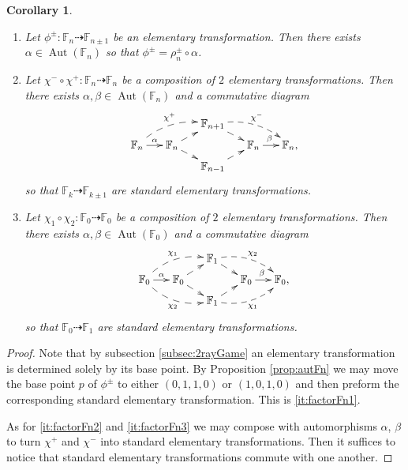 \documentclass[a4paper,11pt]{amsart}
\newtheorem{corollary}[theorem]{Corollary}
\def\Aut{\operatorname{Aut}}
\renewcommand{\FF}{\mathbb{F}}
\newcommand{\rmap}{\dashrightarrow}
\begin{document}
\begin{corollary}\label{cor:factorThoughFn-1}\leavevmode
	\begin{enumerate}
		\item\label{it:factorFn1} Let $\phi^{\pm}\colon \FF_n \rmap \FF_{n \pm 1}$ be an elementary transformation.
		Then there exists $\alpha \in \Aut(\FF_n)$ so that $\phi^{\pm} = \rho_n^{\pm} \circ \alpha$.
		\item\label{it:factorFn2} Let $\chi^-\circ\chi^+\colon \FF_n \rmap \FF_n$ be a composition of $2$ elementary transformations.
		Then there exists $\alpha, \beta \in \Aut(\FF_n)$ and a commutative diagram
		\begin{equation*}%
			\begin{gathered}
				\xymatrix@R=0.15cm@C=.5cm{
					&& \FF_{n+1} \ar@{-->}[dr] \ar@/^.8pc/@{-->}[drr]^{\chi^-}\\
					\FF_n\ar@/^.8pc/@{-->}[urr]^{\chi^+}  \ar[r]^{\alpha} &\FF_n   \ar@{-->}[ur] \ar@{-->}[dr] && 				\FF_n \ar[r]^{\beta\,\,\,} & \FF_n, \\
					&& \FF_{n-1} \ar@{-->}[ur]
				}
			\end{gathered}
		\end{equation*}
		so that $\FF_k \rmap \FF_{k\pm 1}$ are standard elementary transformations.
		\item\label{it:factorFn3}
		Let $\chi_1 \circ \chi_2\colon \FF_0 \rmap \FF_0$ be a composition of $2$ elementary transformations.
		Then there exists $\alpha, \beta \in \Aut(\FF_0)$ and a commutative diagram
		\begin{equation*}%
			\begin{gathered}
				\xymatrix@R=0.15cm@C=.5cm{
					&& \FF_{1} \ar@{-->}[dr] \ar@/^.8pc/@{-->}[drr]^{\chi_2}\\
					\FF_0\ar@/^.8pc/@{-->}[urr]^{\chi_1} 
					\ar@/_.8pc/@{-->}[drr]_{\chi_2}  \ar[r]^{\alpha} &\FF_0   \ar@{-->}[ur] \ar@{-->}[dr] && 				\FF_0 \ar[r]^{\beta\,\,\,} & \FF_0, \\
					&& \FF_{1} \ar@/_.8pc/@{-->}[urr]_{\chi_1} \ar@{-->}[ur]
				}
			\end{gathered}
		\end{equation*}
		so that $\FF_0 \rmap \FF_{1}$ are standard elementary transformations.
	\end{enumerate}
\end{corollary}

\begin{proof}
	Note that by subsection \ref{subsec:2rayGame} an elementary transformation is determined solely by its base point.
	By Proposition \ref{prop:autFn} we may move the base point $p$ of $\phi^{\pm}$ to either $(0,1,1,0)$ or $(1,0,1,0)$ and then preform the corresponding standard elementary transformation.
	This is \eqref{it:factorFn1}.
	
	As for \eqref{it:factorFn2} and \eqref{it:factorFn3} we may compose with automorphisms $\alpha$, $\beta$ to turn $\chi^+$ and $\chi^-$ into standard elementary transformations.
	Then it suffices to notice that standard elementary transformations commute with one another.
\end{proof}
\end{document}
